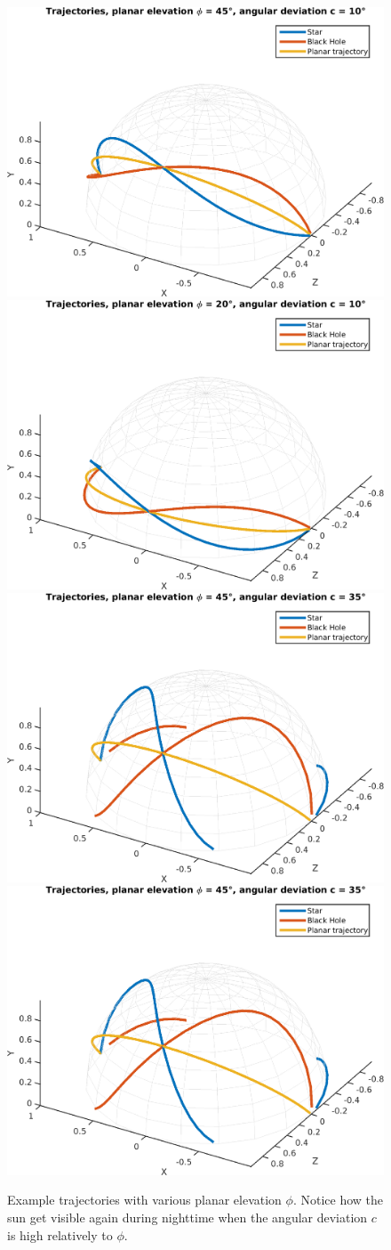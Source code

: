 \documentclass{report}
\begin{document}
\begin{figure}
  \centering
  \includegraphics[width=0.45\linewidth]{q4_trajectory_el45_dev10.png}
  \includegraphics[width=0.45\linewidth]{q4_trajectory_el20_dev10.png} \\ \vspace{1em}
  \includegraphics[width=0.45\linewidth]{q4_trajectory_el45_dev35.png}
  \includegraphics[width=0.45\linewidth]{q4_trajectory_el45_dev35.png}
  \caption[Example trajectories]
   {Example trajectories with various planar elevation $\phi$. Notice how the sun get visible again during nighttime when the angular deviation $c$ is high relatively to $\phi$.}
  \label{q4:trajectories}
\end{figure}
\end{document}
